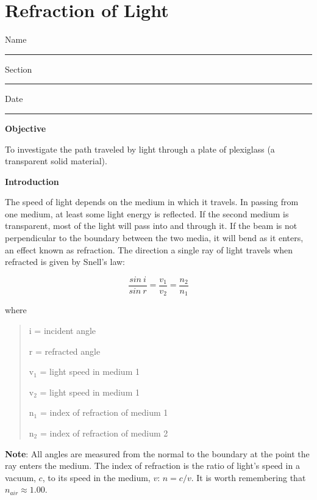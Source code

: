 
\section{Refraction of Light}

Name \rule{2.0in}{0.1pt}\hfill{}Section \rule{1.0in}{0.1pt}\hfill{}Date
\rule{1.0in}{0.1pt}

\textbf{Objective}

To investigate the path traveled by light through a plate of plexiglass
(a transparent solid material).

\textbf{Introduction}

The speed of light depends on the medium in which it travels. In passing
from one medium, at least some light energy is reflected. If the second
medium is transparent, most of the light will pass into and through
it. If the beam is not perpendicular to the boundary between the two
media, it will bend as it enters, an effect known as refraction. The
direction a single ray of light travels when refracted is given by
Snell's law:

\begin{displaymath} \frac{sin~i}{sin~r} = \frac{v_1}{v_2} = \frac{n_2}{n_1} \end{displaymath}

where

\begin{quote}
i = incident angle

r = refracted angle

v\( _{1} \) = light speed in medium 1

v\( _{2} \) = light speed in medium 1

n\( _{1} \) = index of refraction of medium 1 

n\( _{2} \) = index of refraction of medium 2
\end{quote}
\textbf{Note}: All angles are measured from the normal to the boundary
at the point the ray enters the medium. The index of refraction is
the ratio of light's speed in a vacuum, $c$, to its speed in the medium,
$v$: $n = c / v$. It is worth remembering that $n_{air} \approx 1.00$.

